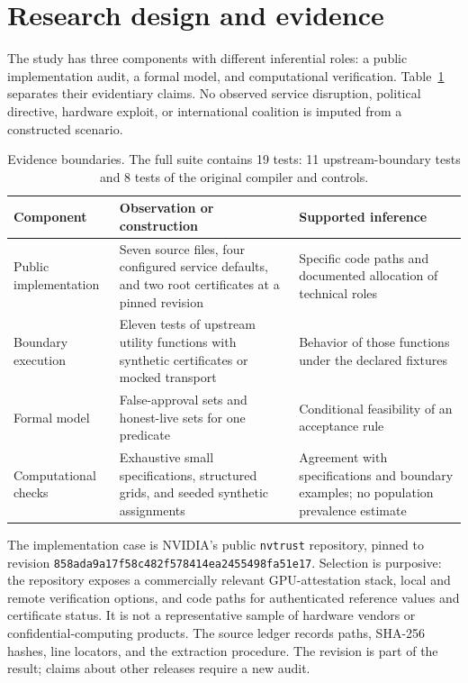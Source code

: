 \documentclass[11pt,letterpaper]{article}
\begin{document}
\section{Research design and evidence}
The study has three components with different inferential roles: a public implementation audit, a formal model, and computational verification. Table~\ref{tab:evidence} separates their evidentiary claims. No observed service disruption, political directive, hardware exploit, or international coalition is imputed from a constructed scenario.

\begin{table}[ht]
\centering\small
\begin{tabular}{p{.21\linewidth}p{.35\linewidth}p{.35\linewidth}}
\toprule
Component & Observation or construction & Supported inference \\
\midrule
Public implementation & Seven source files, four configured service defaults, and two root certificates at a pinned revision & Specific code paths and documented allocation of technical roles \\
Boundary execution & Eleven tests of upstream utility functions with synthetic certificates or mocked transport & Behavior of those functions under the declared fixtures \\
Formal model & False-approval sets and honest-live sets for one predicate & Conditional feasibility of an acceptance rule \\
Computational checks & Exhaustive small specifications, structured grids, and seeded synthetic assignments & Agreement with specifications and boundary examples; no population prevalence estimate \\
\bottomrule
\end{tabular}
\caption{Evidence boundaries. The full suite contains 19 tests: 11 upstream-boundary tests and 8 tests of the original compiler and controls.}\label{tab:evidence}
\end{table}

The implementation case is NVIDIA's public \texttt{nvtrust} repository, pinned to revision \nolinkurl{858ada9a17f58c482f578414ea2455498fa51e17}. Selection is purposive: the repository exposes a commercially relevant GPU-attestation stack, local and remote verification options, and code paths for authenticated reference values and certificate status. It is not a representative sample of hardware vendors or confidential-computing products. The source ledger records paths, SHA-256 hashes, line locators, and the extraction procedure. The revision is part of the result; claims about other releases require a new audit.
\end{document}
